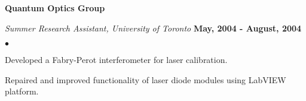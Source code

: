 \documentclass[margin,line]{res}
\newenvironment{list2}{
  \begin{list}{$\bullet$}{%
      \setlength{\itemsep}{0in}
      \setlength{\parsep}{0in} \setlength{\parskip}{0in}
      \setlength{\topsep}{0in} \setlength{\partopsep}{0in}
      \setlength{\leftmargin}{0.2in}}}{\end{list}}
\begin{document}
\begin{resume}
{\bf Quantum Optics Group}

\vspace{-.3cm}
{\em Summer Research Assistant, University of Toronto} \hfill {\bf May, 2004 - August, 2004}\\
\vspace*{-2mm}
\begin{list2}
\item Developed a Fabry-Perot interferometer for laser calibration.
\item Repaired and improved functionality of laser diode modules using
  LabVIEW platform.
\end{list2}


%
%

\end{resume}
\end{document}
